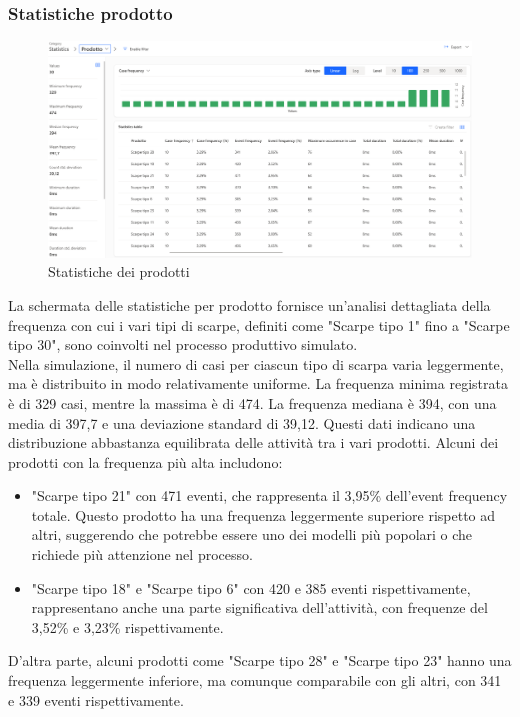 \documentclass{article}
\begin{document}
\subsubsection{Statistiche prodotto}
\begin{figure}[H]
    \centering
    \includegraphics[width=\textwidth]{imgMicrosoft/TerzaSimulazione/StatisticsProdottoSimulazione3.png}
    \caption{Statistiche dei prodotti}
    \label{fig:statistics-prodotti}
\end{figure}
La schermata delle statistiche per prodotto fornisce un'analisi dettagliata della frequenza con cui i vari tipi di scarpe, definiti come "Scarpe tipo 1" fino a "Scarpe tipo 30", sono coinvolti nel processo produttivo simulato.\\
Nella simulazione, il numero di casi per ciascun tipo di scarpa varia leggermente, ma è distribuito in modo relativamente uniforme. La frequenza minima registrata è di 329 casi, mentre la massima è di 474. La frequenza mediana è 394, con una media di 397,7 e una deviazione standard di 39,12. Questi dati indicano una distribuzione abbastanza equilibrata delle attività tra i vari prodotti. Alcuni dei prodotti con la frequenza più alta includono:
\begin{itemize}
    \item "Scarpe tipo 21" con 471 eventi, che rappresenta il 3,95\% dell'event frequency totale. Questo prodotto ha una frequenza leggermente superiore rispetto ad altri, suggerendo che potrebbe essere uno dei modelli più popolari o che richiede più attenzione nel processo.
    \item "Scarpe tipo 18" e "Scarpe tipo 6" con 420 e 385 eventi rispettivamente, rappresentano anche una parte significativa dell'attività, con frequenze del 3,52\% e 3,23\% rispettivamente.
\end{itemize}
D'altra parte, alcuni prodotti come "Scarpe tipo 28" e "Scarpe tipo 23" hanno una frequenza leggermente inferiore, ma comunque comparabile con gli altri, con 341 e 339 eventi rispettivamente.\\
\end{document}
